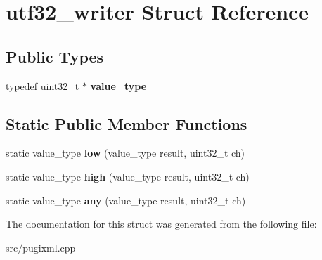 \hypertarget{structutf32__writer}{}\section{utf32\+\_\+writer Struct Reference}
\label{structutf32__writer}
\subsection*{Public Types}
\begin{DoxyCompactItemize}
\item 
\mbox{\label{structutf32__writer_a2284e1fa3406f113f151ded2aaa8d4ae}} 
typedef uint32\+\_\+t $\ast$ {\bfseries value\+\_\+type}
\end{DoxyCompactItemize}
\subsection*{Static Public Member Functions}
\begin{DoxyCompactItemize}
\item 
\mbox{\label{structutf32__writer_a06e1b65906f7355ea54a622248095bc7}} 
static value\+\_\+type {\bfseries low} (value\+\_\+type result, uint32\+\_\+t ch)
\item 
\mbox{\label{structutf32__writer_a3f86d996cde3ed7cab5c31930b67c9f1}} 
static value\+\_\+type {\bfseries high} (value\+\_\+type result, uint32\+\_\+t ch)
\item 
\mbox{\label{structutf32__writer_aa94aaa4a13e755942e7da70ea7700d3e}} 
static value\+\_\+type {\bfseries any} (value\+\_\+type result, uint32\+\_\+t ch)
\end{DoxyCompactItemize}


The documentation for this struct was generated from the following file\+:\begin{DoxyCompactItemize}
\item 
src/pugixml.\+cpp\end{DoxyCompactItemize}
